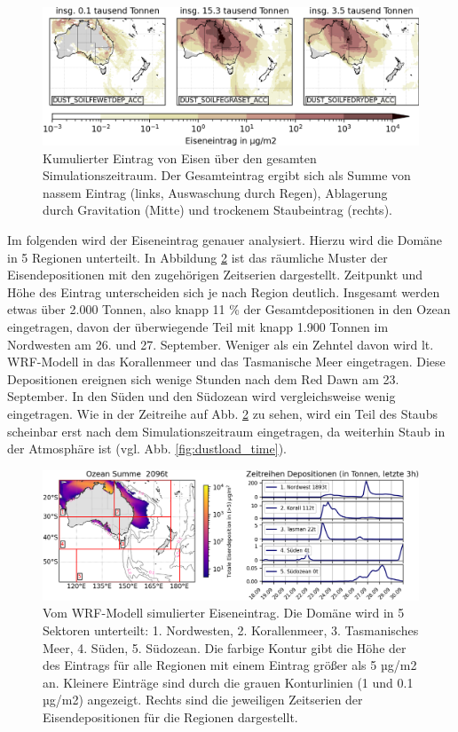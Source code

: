 \documentclass[12pt,a4paper,onecolumn,headheight=30pt]{scrartcl}
\begin{document}
\begin{figure}[htbp]
\includegraphics[width=\textwidth]{bilder/iron_deposition_vars.png}
\caption{Kumulierter Eintrag von Eisen über den gesamten Simulationszeitraum. Der Gesamteintrag ergibt sich als Summe von nassem Eintrag (links, Auswaschung durch Regen), Ablagerung durch Gravitation (Mitte) und trockenem Staubeintrag (rechts).} \label{fig:iron_deposition}
\end{figure}
Im folgenden wird der Eiseneintrag genauer analysiert. Hierzu wird die Domäne in 5 Regionen unterteilt. In Abbildung \ref{fig:iron_deposition_sections} ist das räumliche Muster der Eisendepositionen mit den zugehörigen Zeitserien dargestellt. Zeitpunkt und Höhe des Eintrag unterscheiden sich je nach Region deutlich. Insgesamt werden etwas über 2.000 Tonnen, also knapp 11 \% der Gesamtdepositionen in den Ozean eingetragen, davon der überwiegende Teil mit knapp 1.900 Tonnen im Nordwesten am 26. und 27. September. Weniger als ein Zehntel davon wird lt. WRF-Modell in das Korallenmeer und das Tasmanische Meer eingetragen. Diese Depositionen ereignen sich wenige Stunden nach dem Red Dawn am 23. September. In den Süden und den Südozean wird vergleichsweise wenig eingetragen. Wie in der Zeitreihe auf Abb. \ref{fig:iron_deposition_sections} zu sehen, wird ein Teil des Staubs scheinbar erst nach dem Simulationszeitraum eingetragen, da weiterhin Staub in der Atmosphäre ist (vgl. Abb. \ref{fig:dustload_time}).
\begin{figure}[htbp]
\includegraphics[width=\textwidth]{bilder/total_iron.png}
\caption{Vom WRF-Modell simulierter Eiseneintrag. Die Domäne wird in 5 Sektoren unterteilt: 1. Nordwesten, 2. Korallenmeer, 3. Tasmanisches Meer, 4. Süden, 5. Südozean. Die farbige Kontur gibt die Höhe der des Eintrags für alle Regionen mit einem Eintrag größer als 5 µg/m2 an. Kleinere Einträge sind durch die grauen Konturlinien (1 und 0.1 µg/m2) angezeigt. Rechts sind die jeweiligen Zeitserien der Eisendepositionen für die Regionen dargestellt.} \label{fig:iron_deposition_sections}
\end{figure}
\end{document}
